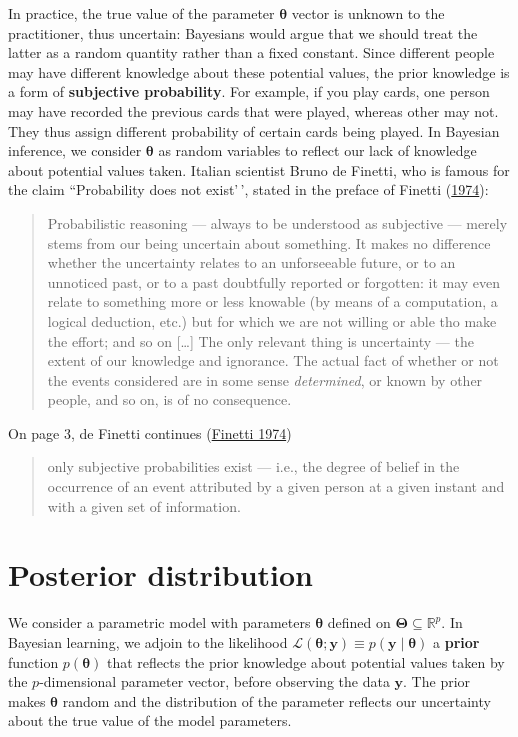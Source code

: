 \documentclass[
  11pt,
  letterpaper,
]{scrbook}
\theoremstyle{definition}
\theoremstyle{definition}
\theoremstyle{definition}
\theoremstyle{plain}
\theoremstyle{remark}
\begin{document}
In practice, the true value of the parameter \(\boldsymbol{\theta}\)
vector is unknown to the practitioner, thus uncertain: Bayesians would
argue that we should treat the latter as a random quantity rather than a
fixed constant. Since different people may have different knowledge
about these potential values, the prior knowledge is a form of
\textbf{subjective probability}. For example, if you play cards, one
person may have recorded the previous cards that were played, whereas
other may not. They thus assign different probability of certain cards
being played. In Bayesian inference, we consider \(\boldsymbol{\theta}\)
as random variables to reflect our lack of knowledge about potential
values taken. Italian scientist Bruno de Finetti, who is famous for the
claim ``Probability does not exist'\,', stated in the preface of Finetti
(\protect\hyperlink{ref-deFinetti:1974}{1974}):

\begin{quote}
Probabilistic reasoning --- always to be understood as subjective ---
merely stems from our being uncertain about something. It makes no
difference whether the uncertainty relates to an unforseeable future, or
to an unnoticed past, or to a past doubtfully reported or forgotten: it
may even relate to something more or less knowable (by means of a
computation, a logical deduction, etc.) but for which we are not willing
or able tho make the effort; and so on {[}\ldots{]} The only relevant
thing is uncertainty --- the extent of our knowledge and ignorance. The
actual fact of whether or not the events considered are in some sense
\emph{determined}, or known by other people, and so on, is of no
consequence.
\end{quote}

On page 3, de Finetti continues
(\protect\hyperlink{ref-deFinetti:1974}{Finetti 1974})

\begin{quote}
only subjective probabilities exist --- i.e., the degree of belief in
the occurrence of an event attributed by a given person at a given
instant and with a given set of information.
\end{quote}

\hypertarget{posterior-distribution}{%
\section{Posterior distribution}\label{posterior-distribution}}

We consider a parametric model with parameters \(\boldsymbol{\theta}\)
defined on \(\boldsymbol{\Theta} \subseteq \mathbb{R}^p\). In Bayesian
learning, we adjoin to the likelihood
\(\mathcal{L}(\boldsymbol{\theta}; \boldsymbol{y}) \equiv p(\boldsymbol{y} \mid \boldsymbol{\theta})\)
a \textbf{prior} function \(p(\boldsymbol{\theta})\) that reflects the
prior knowledge about potential values taken by the \(p\)-dimensional
parameter vector, before observing the data \(\boldsymbol{y}\). The
prior makes \(\boldsymbol{\theta}\) random and the distribution of the
parameter reflects our uncertainty about the true value of the model
parameters.
\end{document}
